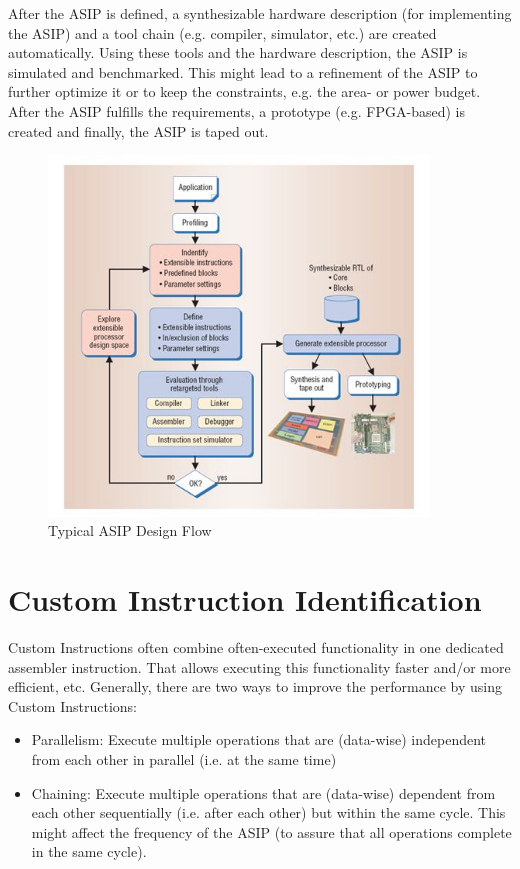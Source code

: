 After the ASIP is defined, a synthesizable hardware description (for
implementing the ASIP) and a tool chain (e.g. compiler, simulator, etc.)
are created automatically. Using these tools and the hardware
description, the ASIP is simulated and benchmarked. This might lead to a
refinement of the ASIP to further optimize it or to keep the
constraints, e.g. the area- or power budget. After the ASIP fulfills the
requirements, a prototype (e.g. FPGA-based) is created and finally, the
ASIP is taped out.
\begin{figure}[!htb]
	\centering
	\includegraphics[width=0.9\textwidth]{src/images/1-2.png}
	\caption{Typical ASIP Design Flow \cite{Henkel03}}
	\label{fig:fig12}
\end{figure}
\hypertarget{custom-instruction-identification}{%
\section{Custom Instruction
Identification}\label{custom-instruction-identification}}
Custom Instructions often combine often-executed functionality in one
dedicated assembler instruction. That allows executing this
functionality faster and/or more efficient, etc. Generally, there are
two ways to improve the performance by using Custom Instructions:
\begin{itemize}
\item
  Parallelism: Execute multiple operations that are (data-wise)
  independent from each other in parallel (i.e. at the same time)
\item
  Chaining: Execute multiple operations that are (data-wise) dependent
  from each other sequentially (i.e. after each other) but within the
  same cycle. This might affect the frequency of the ASIP (to assure
  that all operations complete in the same cycle).
\end{itemize}
